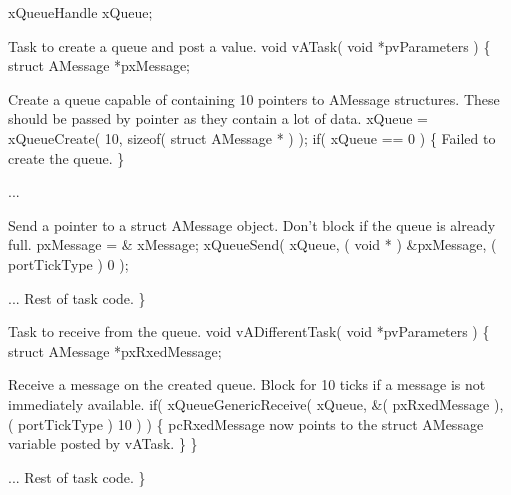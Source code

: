 \begin{DoxyPre} xQueueHandle xQueue;\end{DoxyPre}



\begin{DoxyPre}Task to create a queue and post a value.
 void vATask( void *pvParameters )
 \{
 struct AMessage *pxMessage;\end{DoxyPre}



\begin{DoxyPre}Create a queue capable of containing 10 pointers to AMessage structures.
These should be passed by pointer as they contain a lot of data.
        xQueue = xQueueCreate( 10, sizeof( struct AMessage * ) );
        if( xQueue == 0 )
        \{
Failed to create the queue.
        \}\end{DoxyPre}



\begin{DoxyPre}...\end{DoxyPre}



\begin{DoxyPre}Send a pointer to a struct AMessage object.  Don't block if the
queue is already full.
        pxMessage = \& xMessage;
        xQueueSend( xQueue, ( void * ) \&pxMessage, ( portTickType ) 0 );\end{DoxyPre}



\begin{DoxyPre}... Rest of task code.
 \}\end{DoxyPre}



\begin{DoxyPre}Task to receive from the queue.
 void vADifferentTask( void *pvParameters )
 \{
 struct AMessage *pxRxedMessage;
\begin{DoxyVerb}   if( xQueue != 0 )
   {
\end{DoxyVerb}

Receive a message on the created queue.  Block for 10 ticks if a
message is not immediately available.
                if( xQueueGenericReceive( xQueue, \&( pxRxedMessage ), ( portTickType ) 10 ) )
                \{
pcRxedMessage now points to the struct AMessage variable posted
by vATask.
                \}
        \}\end{DoxyPre}



\begin{DoxyPre}... Rest of task code.
 \}
 \end{DoxyPre}
 